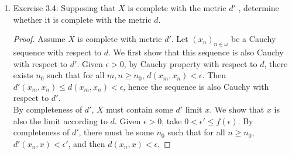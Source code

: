 \documentclass{article}
\begin{document}
\begin{enumerate}
\begin{proof}
      Finally, we can prove the statement using K\"{o}nig's Lemma. Let
      $\mathcal{C}=(\sigma_i)_{i\in\omega}\subseteq 2^{<\omega}$ define an open
      cover of the Cantor space, and assume by contradiction that no finite
      subset of set of covers the space. Let $\mathcal{T}$ be a sub-tree
      of $2^\omega$ consisting of exactly the nodes whose children are not
      covered by any finite subset of $\mathcal{C}$. This sub-tree is
      infinite because each level of $2^\omega$ must contain at least one
      node in $\mathcal{T}$ otherwise $\mathcal{C}$ would finitely cover
      the Cantor space. The sub-tree is also connected because for each
      node in $\mathcal{T}$, its parent node must also be in $\mathcal{T}$.
      Hence by K\"{o}nig's Lemma, $\mathcal{T}$ must contain an infinite
      path. From our construction of $\mathcal{T}$, this path cannot be
      covered by any cover in $\mathcal{C}$, which contradicts
      $\mathcal{C}$ being a cover of the Cantor space.
    \end{proof}

  \item Exercise 3.4: Supposing that $X$ is complete with the metric $d'$ ,
    determine whether it is complete with the metric $d$.
    \begin{proof}
      Assume $X$ is complete with metric $d'$. Let $(x_n)_{n\in\omega}$ be
      a Cauchy sequence with respect to $d$. We first show that this
      sequence is also Cauchy with respect to $d'$. Given $\epsilon>0$, by
      Cauchy property with respect to $d$, there exists $n_0$ such that for
      all $m,n\geq n_0$, $d(x_m,x_n)<\epsilon$. Then
      $d'(x_m,x_n)\leq d(x_m,x_n)<\epsilon$, hence the sequence is also Cauchy
      with respect to $d'$. \\

      By completeness of $d'$, $X$ must contain some $d'$ limit $x$. We
      show that $x$ is also the limit according to $d$. Given $\epsilon>0$,
      take $0<\epsilon'\leq f(\epsilon)$. By completeness of $d'$, there
      must be some $n_0$ such that for all $n\geq n_0$,
      $d'(x_n,x)<\epsilon'$, and then $d(x_n,x)<\epsilon$.
    \end{proof}
\end{enumerate}
\end{document}
